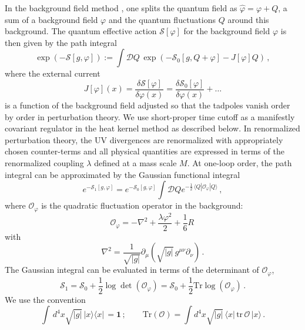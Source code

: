 \documentclass[12pt,a4paper]{article}
\newcommand{\be}{\begin{equation}}
\newcommand{\ee}{\end{equation}}
\newcommand{\cD}{\mathcal{D}}
\newcommand{\cO}{\mathcal{O}}
\newcommand{\cS}{\mathcal{S}}
\renewcommand{\d}{\delta}
\renewcommand{\l}{\lambda}
\newcommand{\m}{\mu}
\newcommand{\n}{\nu}
\newcommand{\1}{{\textbf{1}}}
\newcommand{\half}{\frac{1}{2}}
\newcommand{\Tr}{\mbox{Tr}}
\newcommand{\tr}{\mbox{tr}}
\newcommand{\+}{{\,+ \,}}
\begin{document}
In the background field method  \cite{Abbott:1981ke}, one splits the quantum field as $\hat\varphi = \varphi + Q$, a sum of a background field $\varphi$ and the quantum fluctuations $Q$ around this background.
The quantum effective action $\cS[\varphi]$ for the  background field $\varphi$ is then given by the path integral
\be
\exp{\left(-\cS[g, \varphi]\right)} := \int \cD Q \, \exp { \left(
-\cS_{0}[g, Q + \varphi] - J[\varphi]  Q   \right) } \, ,
\ee
where the external current 
\be
J[\varphi] (x)= \frac{\d \cS[\varphi]}{\d \varphi(x)} = \frac{\d \cS_{0}[\varphi]}{\d \varphi(x)} + \ldots 
\ee
is a function of the background field  adjusted so  that the tadpoles vanish order by order in perturbation theory. We use  short-proper time cutoff as a manifestly covariant regulator in the heat kernel method as described below. In renormalized perturbation theory, the UV divergences are renormalized with appropriately chosen  counter-terms and all physical quantities are expressed in terms of the renormalized coupling $\l$ defined at a mass scale $M$. At one-loop order, the path integral can be approximated  by the Gaussian functional integral 
\be
e^{-\cS_{1}[g, \varphi]}=  e^{-\cS_0[g, \varphi]}\int \cD Q  e^{-\half  \, \langle Q | \cO_\varphi |Q\rangle} \, ,
\ee
where  $\cO_{\varphi}$ is the quadratic fluctuation operator in the background:
\be
\cO_{\varphi} = -\nabla^2 + \frac{\l \varphi^{2}}{2} + \frac{1}{6} R \, 
\ee
with
\be
 \nabla^{2} =  \frac{1}{\sqrt{| g |}}\partial_{\m} (\sqrt{|g|}\, g^{\m\n} \partial_{\n}) \,  .
\ee
The Gaussian integral can be evaluated in terms of the determinant of $\cO_{\varphi}$,  
\be
\cS_{1} = \cS_0  + \half \log \det \left(\cO_\varphi\right) = \cS_0  +  \half  \Tr \log\left(\cO_{\varphi}\right) \, .
\ee
We use the convention
\be\label{Tr}
\int \,   d^{4}x \sqrt{|g|}\, |x\rangle\langle x| \,= \mathbf{1}\, ; \qquad 
\Tr ( \cO)  = \int d^{4}x \sqrt{|g|}\, \langle x| \,\tr\, \cO  \,|x\rangle \, .
\ee
\end{document}
